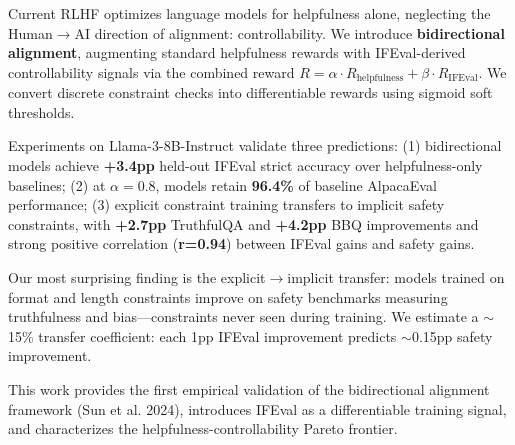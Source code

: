 Current RLHF optimizes language models for helpfulness alone, neglecting the Human$\to$AI direction of alignment: controllability. We introduce \textbf{bidirectional alignment}, augmenting standard helpfulness rewards with IFEval-derived controllability signals via the combined reward $R = \alpha \cdot R_{\text{helpfulness}} + \beta \cdot R_{\text{IFEval}}$. We convert discrete constraint checks into differentiable rewards using sigmoid soft thresholds.

Experiments on Llama-3-8B-Instruct validate three predictions: (1) bidirectional models achieve \textbf{+3.4pp} held-out IFEval strict accuracy over helpfulness-only baselines; (2) at $\alpha=0.8$, models retain \textbf{96.4\%} of baseline AlpacaEval performance; (3) explicit constraint training transfers to implicit safety constraints, with \textbf{+2.7pp} TruthfulQA and \textbf{+4.2pp} BBQ improvements and strong positive correlation (\textbf{r=0.94}) between IFEval gains and safety gains.

Our most surprising finding is the explicit$\to$implicit transfer: models trained on format and length constraints improve on safety benchmarks measuring truthfulness and bias---constraints never seen during training. We estimate a $\sim$15\% transfer coefficient: each 1pp IFEval improvement predicts $\sim$0.15pp safety improvement.

This work provides the first empirical validation of the bidirectional alignment framework (Sun et al. 2024), introduces IFEval as a differentiable training signal, and characterizes the helpfulness-controllability Pareto frontier.
